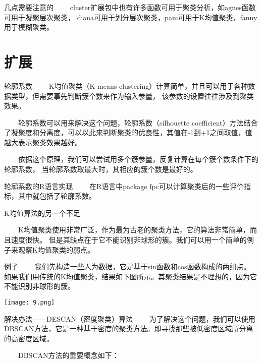 \documentclass[cjk]{beamer}
\begin{document}
\begin{CJK*}{GBK}{kai}
\begin{frame}{几点需要注意的}
\ \ \ \ cluster扩展包中也有许多函数可用于聚类分析，如agnes函数可用于凝聚层次聚类，
diana可用于划分层次聚类，pam可用于K均值聚类，fanny用于模糊聚类。
\end{frame}

\section{扩展}

\begin{frame}{轮廓系数}
\ \ \ \ K均值聚类（K-means clustering）计算简单，并且可以用于各种数据类型，但需要事先判断簇个数来作为输入参量，
该参数的设置往往涉及到聚类效果。

\ \ \ \ 轮廓系数可以用来解决这个问题，轮廓系数（silhouette coefficient）方法结合了凝聚度和分离度，可以以此来判断聚类的优良性，其值在-1到+1之间取值，值越大表示聚类效果越好。

\ \ \ \ 依据这个原理，我们可以尝试用多个簇参量，反复计算在每个簇个数条件下的轮廓系数，
当轮廓系数取最大时，其相应的簇个数是最好的。


\end{frame}


\begin{frame}{轮廓系数的R语言实现}
\ \ \ \ 在R语言中package fpc可以计算聚类后的一些评价指标，其中就包括了轮廓系数。
\end{frame}

\begin{frame}{K均值算法的另一个不足}
  \ \ \ \

  \ \ \ \ K均值聚类使用非常广泛，作为最为古老的聚类方法，它的算法非常简单，而且速度很快。
  但是其缺点在于它不能识别非球形的簇。我们可以用一个简单的例子来观察K均值聚类的弱点。
\end{frame}

\begin{frame}{例子}
\ \ \ \ 我们先构造一些人为数据，它是基于sin函数和cos函数构成的两组点。
如果我们用传统的K均值聚类，结果如下图所示。其聚类结果是不理想的，因为它不能识别非球形的簇。
\begin{center}
\texttt{[image: 9.png]}
\end{center}
\end{frame}

\begin{frame}{解决办法——DESCAN（密度聚类）算法}
  \ \ \ \ 为了解决这个问题，我们可以使用DBSCAN方法，它是一种基于密度的聚类方法。即寻找那些被低密度区域所分离的高密度区域。

\ \ \ \
DBSCAN方法的重要概念如下：


\end{frame}
\end{CJK*}
\end{document}
